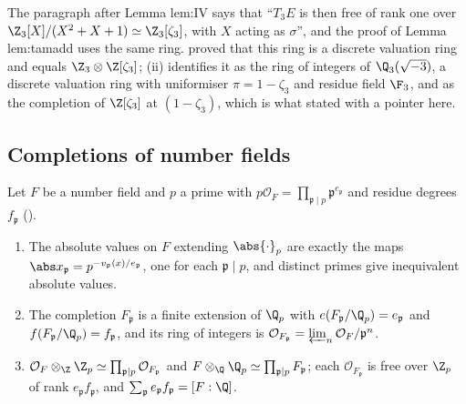 \begin{paperlink}\label{pl:local:z3zeta3}
The paragraph after Lemma lem:IV says that ``$T_3E$ is then free of rank one over $\Z_3[X]/(X^2+X+1)\simeq\Z_3[\zeta_3]$, with $X$ acting as $\sigma$'', and
the proof of Lemma lem:tamadd uses the same ring.  proved that this ring is a discrete valuation ring and equals $\Z_3\otimes\Z[\zeta_3]$;
(ii) identifies it as the ring of integers of $\Q_3(\sqrt{-3})$, a discrete valuation ring with uniformiser $\pi=1-\zeta_3$ and residue
field $\F_3$, and as the completion of $\Z[\zeta_3]$ at $(1-\zeta_3)$, which is what  stated with a pointer here.
\end{paperlink}

\subsection{Completions of number fields}

\begin{theorem}\label{thm:local:completion-numberfield}
Let $F$ be a number field and $p$ a prime with $p\mathcal O_F=\prod_{\mathfrak p\mid p}\mathfrak p^{e_{\mathfrak p}}$ and residue degrees $f_{\mathfrak p}$
().
\begin{enumerate}[label=(\roman*)]
\item The absolute values on $F$ extending $\abs{\cdot}_p$ are exactly the maps $\abs x_{\mathfrak p}=p^{-v_{\mathfrak p}(x)/e_{\mathfrak p}}$, one for each $\mathfrak p\mid p$,
and distinct primes give inequivalent absolute values.
\item The completion $F_{\mathfrak p}$ is a finite extension of $\Q_p$ with $e(F_{\mathfrak p}/\Q_p)=e_{\mathfrak p}$ and $f(F_{\mathfrak p}/\Q_p)=f_{\mathfrak p}$, and
its ring of integers is $\mathcal O_{F_{\mathfrak p}}=\varprojlim_n\mathcal O_F/\mathfrak p^n$.
\item $\mathcal O_F\otimes_\Z\Z_p\simeq\prod_{\mathfrak p\mid p}\mathcal O_{F_{\mathfrak p}}$ and $F\otimes_\Q\Q_p\simeq\prod_{\mathfrak p\mid p}F_{\mathfrak p}$; each
$\mathcal O_{F_{\mathfrak p}}$ is free over $\Z_p$ of rank $e_{\mathfrak p}f_{\mathfrak p}$, and $\sum_{\mathfrak p}e_{\mathfrak p}f_{\mathfrak p}=[F:\Q]$.
\end{enumerate}
\end{theorem}


